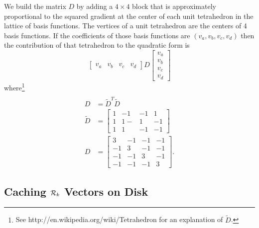 \documentclass[twocolumn]{article}
\newcommand{\Radon}{{\cal R}}
\begin{document}
We build the matrix $D$ by adding a $4 \times 4$ block that is
approximately proportional to the squared gradient at the center of
each unit tetrahedron in the lattice of basis functions.  The vertices
of a unit tetrahedron are the centers of 4 basis functions.  If the
coefficients of those basis functions are $(v_a,v_b,v_c,v_d)$ then
the contribution of that tetrahedron to the quadratic form is
\begin{equation*}
  \begin{bmatrix} v_a&v_b&v_c&v_d \end{bmatrix} D 
  \begin{bmatrix} v_a \\ v_b \\ v_c \\ v_d \end{bmatrix}  
\end{equation*}
where\footnote{See http://en.wikipedia.org/wiki/Tetrahedron for an
  explanation of $\tilde D$.}
\begin{align*} \\
  D &= \tilde D^T \tilde D \\
  \tilde D &=
  \begin{bmatrix}
    1 & -1& -1& 1 \\
    1 & 1-& 1 & -1 \\
    1 & 1 & -1& -1
  \end{bmatrix}\\
  D &=
  \begin{bmatrix}
    3 & -1 & -1 & -1 \\ -1 & 3 & -1 & -1 \\ -1 & -1 & 3 & -1 \\
    -1 & -1 & -1 & 3
  \end{bmatrix}.
\end{align*}

\subsection{Caching $\Radon_k$ Vectors on Disk}
\label{sec:cache}
\end{document}
